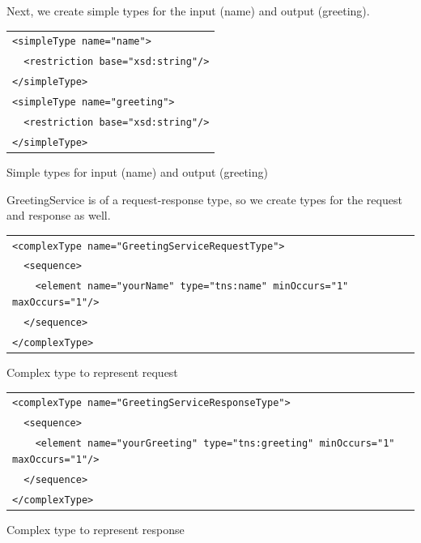 \documentclass{article}
\begin{document}
Next, we create simple types for the input (name) and output (greeting).

\begin{illustration}
\begin{center}
\begin{tabular}{|l|}
\hline
\verb#<simpleType name="name">#\\
\verb#  <restriction base="xsd:string"/>#\\
\verb#</simpleType>#\\

\verb#<simpleType name="greeting">#\\
\verb#  <restriction base="xsd:string"/>#\\
\verb#</simpleType>#\\
\hline
\end{tabular}
\end{center}
\caption{Simple types for input (name) and output (greeting)}
\end{illustration}

GreetingService is of a request-response type, so we create types for
the request and response as well.

\begin{illustration}
\begin{center}
\begin{tabular}{|l|}
\hline
\verb#<complexType name="GreetingServiceRequestType">#\\ 
\verb#  <sequence>#\\ 
\verb#    <element name="yourName" type="tns:name" minOccurs="1" maxOccurs="1"/>#\\ 
\verb#  </sequence>#\\ 
\verb#</complexType>#\\
\hline
\end{tabular}
\end{center}
\caption{Complex type to represent request}
\end{illustration}

\begin{illustration}
\begin{center}
\begin{tabular}{|l|}
\hline
\verb#<complexType name="GreetingServiceResponseType">#\\ 
\verb#  <sequence>#\\ 
\verb#    <element name="yourGreeting" type="tns:greeting" minOccurs="1" maxOccurs="1"/>#\\ 
\verb#  </sequence>#\\ 
\verb#</complexType>#\\
\hline
\end{tabular}
\end{center}
\caption{Complex type to represent response}
\end{illustration}
\end{document}
